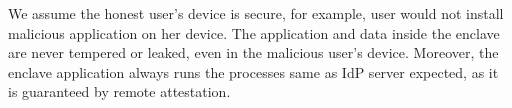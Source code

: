 We assume the honest user's device is secure, for example, user would not install malicious application on her device. 
The application and data inside the enclave are never tempered or leaked, even in the malicious user's device.
Moreover, the enclave application always runs the processes same as IdP server expected, as it is guaranteed by remote attestation.



